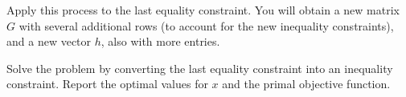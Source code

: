 Apply this process to the last equality constraint. 
You will obtain a new matrix $G$ with several additional rows (to account for the new inequality
constraints), and a new vector $h$, also with more entries. 
\begin{problem}
Solve the problem by converting the last equality constraint into an inequality constraint.
Report the optimal values for $x$ and the primal objective function.
\end{problem}

\begin{comment}
\section*{Example}

Why are all of the terms in $G$ and $h$ non-positive?

\begin{lstlisting}
>>> from cvxopt import matrix, solvers
>>> G = matrix([ [-1., 0., 0., -1., 0.,  -1., 0., 0., 0., 0., 0.],
             [-1., 0., 0., 0., -1.,  0., -1., 0., 0., 0., 0.],
             [0., -1., 0., -1., 0.,  0., 0., -1., 0., 0., 0.],
             [0., -1., 0., 0., -1.,  0., 0., 0., -1., 0., 0.],
             [0., 0., -1., -1., 0.,  0., 0., 0., 0., -1., 0.],
             [0., 0., -1., 0., -1.,  0., 0., 0., 0., 0., -1.] ])

>>> h = matrix([-7., -2., -4., -5., -8.,  0., 0., 0., 0., 0., 0.,])
>>> c = matrix([4., 7., 6., 8., 8., 9])
>>> sol = solvers.lp(c,G,h)
>>> print sol['x']
>>> print sol['primal objective']
\end{lstlisting}

Another method is to use an integer linear program.
Cvxopt is configured to work with  Gnu, which does have an integer linear program.
It will work with either of the methods above.

\textbf{Example}

glpk.ilp returns a tuple.
The first entry describes the optimality of the result, while the second gives the $x$ values.

\begin{lstlisting}
>>> from cvxopt import matrix, solvers, glpk
>>> G = matrix([ [-1., 0., 0., -1., 0.,  -1., 0., 0., 0., 0., 0.],
             [-1., 0., 0., 0., -1.,  0., -1., 0., 0., 0., 0.],
             [0., -1., 0., -1., 0.,  0., 0., -1., 0., 0., 0.],
             [0., -1., 0., 0., -1.,  0., 0., 0., -1., 0., 0.],
             [0., 0., -1., -1., 0.,  0., 0., 0., 0., -1., 0.],
             [0., 0., -1., 0., -1.,  0., 0., 0., 0., 0., -1.] ])


\end{comment}
